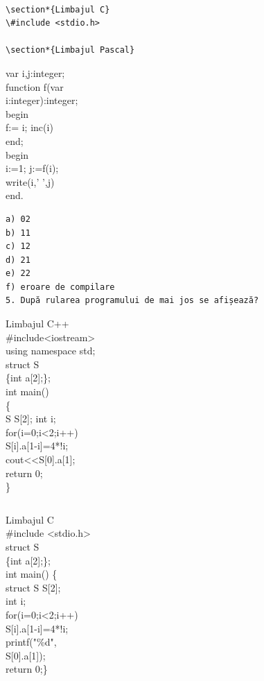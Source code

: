 \documentclass[10pt]{article}
\begin{document}
\begin{verbatim}

\section*{Limbajul C}
\#include <stdio.h>

\section*{Limbajul Pascal}
\end{verbatim}

var i,j:integer;\\
function f(var\\
i:integer):integer;\\
begin\\
f:= i; inc(i)\\
end;\\
begin\\
i:=1; j:=f(i);\\
write(i,' ',j)\\
end.

\begin{verbatim}
a) 02
b) 11
c) 12
d) 21
e) 22
f) eroare de compilare
5. După rularea programului de mai jos se afișează?
\end{verbatim}

Limbajul C++\\
\#include<iostream>\\
using namespace std;\\
struct S\\[0pt]
\{int a[2];\};\\
int main()\\
\{\\[0pt]
S S[2]; int i;\\
for(i=0;i<2;i++)\\[0pt]
S[i].a[1-i]=4*!i;\\[0pt]
cout<<S[0].a[1];\\
return 0;\\
\}

\begin{verbatim}

\end{verbatim}

Limbajul C\\
\#include <stdio.h>\\
struct S\\[0pt]
\{int a[2];\};\\
int main() \{\\[0pt]
struct S S[2];\\
int i;\\
for(i=0;i<2;i++)\\[0pt]
S[i].a[1-i]=4*!i;\\
printf("\%d",\\[0pt]
S[0].a[1]);\\
return 0;\}
\end{document}
